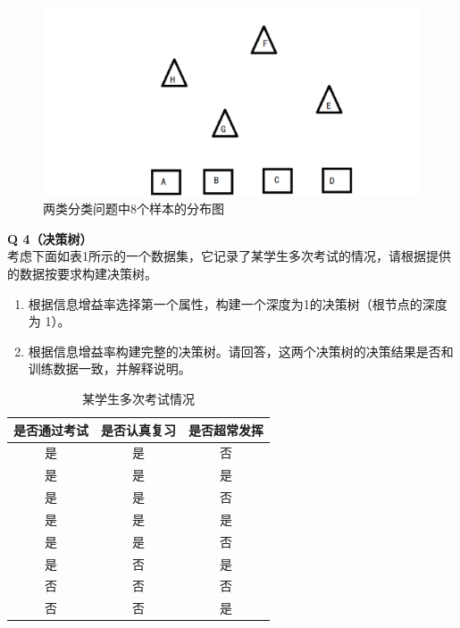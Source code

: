\documentclass[a4paper, 11pt]{article}
\newenvironment{problem}[2][Q]
    { \begin{mdframed}[backgroundcolor=gray!20] \textbf{#1 #2} \\}
    {  \end{mdframed}}
\begin{document}
\begin{CJK}{UTF8}{gbsn}
\begin{figure}[h!]
\centering
\includegraphics[width=0.6\linewidth]{g1.pdf}
\caption{两类分类问题中8个样本的分布图}
\label{fig:g1}
\end{figure}



\begin{problem}{4（决策树）}
考虑下面如表1所示的一个数据集，它记录了某学生多次考试的情况，请根据提供的数据按要求构建决策树。
\begin{enumerate}[1)]
    \item 根据信息增益率选择第一个属性，构建一个深度为1的决策树（根节点的深度为 1）。
    \item 根据信息增益率构建完整的决策树。请回答，这两个决策树的决策结果是否和训练数据一致，并解释说明。
\end{enumerate}
\end{problem}

\begin{table}[h]
    \centering
    \caption{某学生多次考试情况}
    \label{tab:number}
    \begin{tabular}{ccc}
        \hline
        是否通过考试 & 是否认真复习 & 是否超常发挥 \\
        \hline \hline
        是 & 是 & 否 \\ \hline
        是 & 是 & 是 \\ \hline
        是 & 是 & 否 \\ \hline
        是 & 是 & 是 \\ \hline
        是 & 是 & 否 \\ \hline
        是 & 否 & 是 \\ \hline
        否 & 否 & 否 \\ \hline
        否 & 否 & 是 \\ \hline
    \end{tabular}
\end{table}




\end{CJK}
\end{document}
